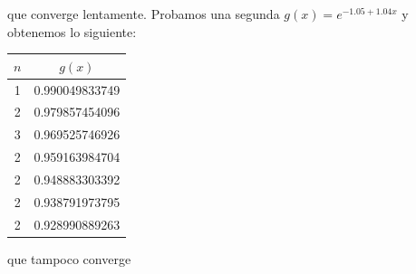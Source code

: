 \documentclass{article}
\begin{document}
que converge lentamente.
Probamos una segunda $g(x) = e^{-1.05 + 1.04x}$ y obtenemos lo siguiente:

\begin{center}
    \begin{tabular}{||c c||} 
    \hline
    $n$ & $g(x)$\\ [0.5ex] 
    \hline
    1 & 0.990049833749 \\
    \hline
    2 & 0.979857454096 \\
    \hline
    3 & 0.969525746926 \\ 
    \hline
    2 & 0.959163984704 \\
    \hline
    2 & 0.948883303392 \\
    \hline
    2 & 0.938791973795 \\
    \hline
    2 & 0.928990889263 \\ [1ex]
    \hline
   \end{tabular}
\end{center}
que tampoco converge
\end{document}
